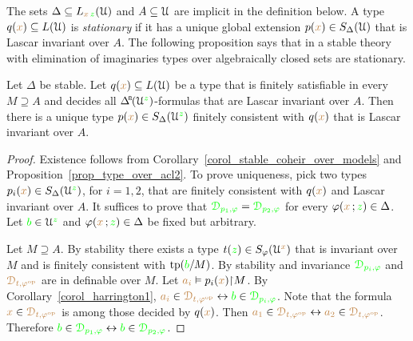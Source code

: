 The sets $\Delta\subseteq L_{{\color{brown} x}\,{\color{green} z}}(\EuScript U)$ and $A\subseteq\EuScript U$ are implicit in the definition below.
A type $q({\color{brown} x})\subseteq L(\EuScript U)$ is \emph{stationary\/} if it has a unique global extension $p({\color{brown} x})\in S_\Delta(\EuScript U)$ that is Lascar invariant over $A$.
The following proposition says that in a stable theory with elimination of imaginaries types over algebraically closed sets are stationary.


\begin{theorem}[ (Stationarity)]\label{thm_stationarity}
  Let $\Delta$ be stable.
  Let $q({\color{brown} x})\subseteq L(\EuScript U)$ be a type that is finitely satisfiable in every $M\supseteq A$ and decides all $\BDelta(\U^{\gr z})$-formulas that are Lascar invariant over $A$.
  Then there is a unique type $p({\color{brown} x})\in S_\Delta(\EuScript U^{\color{green} z})$ finitely consistent with $q({\color{brown} x})$ that is Lascar invariant over $A$.
\end{theorem}

\begin{proof}
  Existence follows from Corollary~\ref{corol_stable_coheir_over_models} and Proposition~\ref{prop_type_over_acl2}.
  To prove uniqueness, pick two types $p_i({\color{brown} x})\in S_\Delta(\EuScript U^{\color{green} z})$, for $i=1,2$, that are finitely consistent with $q({\color{brown} x})$ and Lascar invariant over $A$.
  It suffices to prove that ${\color{green}\EuScript D_{p_1,\varphi}}={\color{green}\EuScript D_{p_2,\varphi}}$ for every $\varphi({\color{brown} x}\,;{\color{green} z})\in\Delta$.
  Let ${\color{green} b}\in\EuScript U^{\color{green} z}$ and $\varphi({\color{brown} x}\,;{\color{green} z})\in\Delta$ be fixed but arbitrary.

  Let $M\supseteq A$.
  By stability there exists a type $t({\color{green} z})\in S_\varphi(\EuScript U^{\color{brown} x})$ that is invariant over $M$ and is finitely consistent with ${\rm tp}({\color{green} b}/M)$.
  By stability and invariance ${\color{green}\EuScript D_{p_i,\varphi}}$ and ${\color{brown}\EuScript D_{t,\varphi^{\rm op}}}$ are in definable over $M$.
  Let ${\color{brown} a_i}\vDash p_i({\color{brown} x}){\restriction}M$.
  By Corollary~\ref{corol_harrington1}, ${\color{brown} a_i}\in{\color{brown}\EuScript D_{t,\varphi^{\rm op}}}\leftrightarrow{\color{green}b}\in{\color{green}\EuScript D_{p_i,\varphi}}$.
  Note that the formula ${\color{brown} x}\in{\color{brown}\EuScript D_{t,\varphi^{\rm op}}}$ is among those decided by $q({\color{brown} x})$.
  Then ${\color{brown} a_1}\in{\color{brown}\EuScript D_{t,\varphi^{\rm op}}}\leftrightarrow{\color{brown}a_2}\in{\color{brown}\EuScript D_{t,\varphi^{\rm op}}}$.
  Therefore ${\color{green} b}\in{\color{green}\EuScript D_{p_1,\varphi}}\leftrightarrow{\color{green}b}\in{\color{green}\EuScript D_{p_2,\varphi}}$.
\end{proof}

